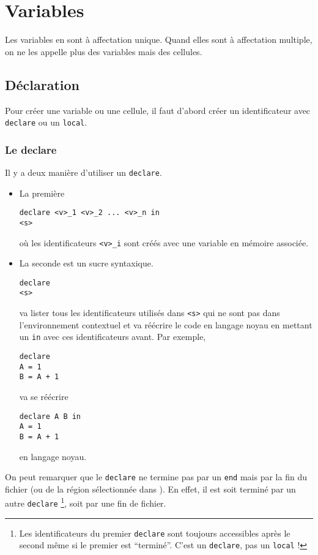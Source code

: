 \section{Variables}
Les variables en \oz{} sont à affectation unique.
Quand elles sont à affectation multiple, on ne les appelle plus des variables
mais des cellules.

\subsection{Déclaration}
\label{sec:dec}
Pour créer une variable ou une cellule,
il faut d'abord créer un identificateur avec \lstinline|declare| ou un
\lstinline|local|.

\subsubsection{Le \keyword{} declare}
Il y a deux manière d'utiliser un \lstinline|declare|.
\begin{itemize}
  \item
    La première
    \begin{lstlisting}
declare <v>_1 <v>_2 ... <v>_n in
<s>
    \end{lstlisting}
    où les identificateurs \lstinline|<v>_i| sont créés
    avec une variable en mémoire associée.

  \item
    La seconde est un sucre syntaxique.
    \begin{lstlisting}
declare
<s>
    \end{lstlisting}
    \oz{} va lister tous les identificateurs utilisés dans \lstinline|<s>|
    qui ne sont pas dans l'environnement contextuel
    et va réécrire le code en langage noyau en mettant un \lstinline|in|
    avec ces identificateurs avant.
    Par exemple,
    \begin{lstlisting}
declare
A = 1
B = A + 1
    \end{lstlisting}
    va se réécrire
    \begin{lstlisting}
declare A B in
A = 1
B = A + 1
    \end{lstlisting}
    en langage noyau.
\end{itemize}
On peut remarquer que le \lstinline|declare| ne termine
pas par un \lstinline|end| mais par la fin du fichier (ou de la région
sélectionnée dans \mozart{}).
En effet, il est soit terminé par un autre \lstinline|declare| \footnote{Les identificateurs du premier \lstinline|declare| sont toujours accessibles après le second même si le premier est ``terminé''. C'est un \lstinline|declare|, pas un \lstinline|local| !}, soit par
une fin de fichier.

